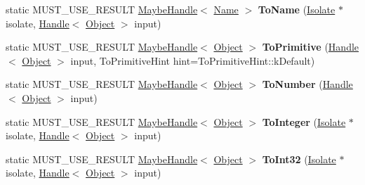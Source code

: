 \begin{DoxyCompactItemize}
\item 
static M\+U\+S\+T\+\_\+\+U\+S\+E\+\_\+\+R\+E\+S\+U\+LT \hyperlink{classv8_1_1internal_1_1_maybe_handle}{Maybe\+Handle}$<$ \hyperlink{classv8_1_1internal_1_1_name}{Name} $>$ {\bfseries To\+Name} (\hyperlink{classv8_1_1internal_1_1_isolate}{Isolate} $\ast$isolate, \hyperlink{classv8_1_1internal_1_1_handle}{Handle}$<$ \hyperlink{classv8_1_1internal_1_1_object}{Object} $>$ input)\hypertarget{classv8_1_1internal_1_1_object_a0baa14efcccb929b0bba96b408c0d964}{}\label{classv8_1_1internal_1_1_object_a0baa14efcccb929b0bba96b408c0d964}

\item 
static M\+U\+S\+T\+\_\+\+U\+S\+E\+\_\+\+R\+E\+S\+U\+LT \hyperlink{classv8_1_1internal_1_1_maybe_handle}{Maybe\+Handle}$<$ \hyperlink{classv8_1_1internal_1_1_object}{Object} $>$ {\bfseries To\+Primitive} (\hyperlink{classv8_1_1internal_1_1_handle}{Handle}$<$ \hyperlink{classv8_1_1internal_1_1_object}{Object} $>$ input, To\+Primitive\+Hint hint=To\+Primitive\+Hint\+::k\+Default)\hypertarget{classv8_1_1internal_1_1_object_ab6d857792d0414a04df363e58d57ed0c}{}\label{classv8_1_1internal_1_1_object_ab6d857792d0414a04df363e58d57ed0c}

\item 
static M\+U\+S\+T\+\_\+\+U\+S\+E\+\_\+\+R\+E\+S\+U\+LT \hyperlink{classv8_1_1internal_1_1_maybe_handle}{Maybe\+Handle}$<$ \hyperlink{classv8_1_1internal_1_1_object}{Object} $>$ {\bfseries To\+Number} (\hyperlink{classv8_1_1internal_1_1_handle}{Handle}$<$ \hyperlink{classv8_1_1internal_1_1_object}{Object} $>$ input)\hypertarget{classv8_1_1internal_1_1_object_a3de3bcd0270247c89b29b6657f60d394}{}\label{classv8_1_1internal_1_1_object_a3de3bcd0270247c89b29b6657f60d394}

\item 
static M\+U\+S\+T\+\_\+\+U\+S\+E\+\_\+\+R\+E\+S\+U\+LT \hyperlink{classv8_1_1internal_1_1_maybe_handle}{Maybe\+Handle}$<$ \hyperlink{classv8_1_1internal_1_1_object}{Object} $>$ {\bfseries To\+Integer} (\hyperlink{classv8_1_1internal_1_1_isolate}{Isolate} $\ast$isolate, \hyperlink{classv8_1_1internal_1_1_handle}{Handle}$<$ \hyperlink{classv8_1_1internal_1_1_object}{Object} $>$ input)\hypertarget{classv8_1_1internal_1_1_object_aee5b6ebe27e99fc2b48fa42db7b1933a}{}\label{classv8_1_1internal_1_1_object_aee5b6ebe27e99fc2b48fa42db7b1933a}

\item 
static M\+U\+S\+T\+\_\+\+U\+S\+E\+\_\+\+R\+E\+S\+U\+LT \hyperlink{classv8_1_1internal_1_1_maybe_handle}{Maybe\+Handle}$<$ \hyperlink{classv8_1_1internal_1_1_object}{Object} $>$ {\bfseries To\+Int32} (\hyperlink{classv8_1_1internal_1_1_isolate}{Isolate} $\ast$isolate, \hyperlink{classv8_1_1internal_1_1_handle}{Handle}$<$ \hyperlink{classv8_1_1internal_1_1_object}{Object} $>$ input)\hypertarget{classv8_1_1internal_1_1_object_ab5d0c0570ca4799300e7000d13565209}{}\label{classv8_1_1internal_1_1_object_ab5d0c0570ca4799300e7000d13565209}


\end{DoxyCompactItemize}
